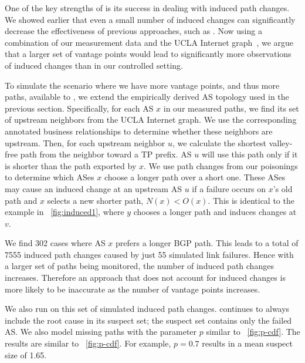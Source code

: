 One of the key strengths of \ouralgo is its success in dealing with
induced path changes. We showed earlier that even a small 
number of induced changes can significantly decrease the effectiveness
of previous approaches, such as \feldmann. Now using a combination
of our measurement data and the UCLA Internet graph~\cite{ucla-topology}, 
we argue that a larger set of vantage points would lead to significantly 
more observations of induced changes than in our controlled setting. 

To simulate the scenario where we have more vantage points, and thus
more paths, available to \ouralgo, we extend the empirically derived AS
topology used in the previous section. Specifically, for each AS $x$ in
our measured paths, we find its set of upstream neighbors from the UCLA
Internet graph. We use the corresponding annotated business
relationships to determine whether these neighbors are upstream. Then,
for each upstream neighbor $u$, we calculate the shortest valley-free
path from the neighbor toward a TP prefix. AS $u$ will use this path
only if it is shorter than the path exported by $x$.  We use path
changes from our poisonings to determine which ASes $x$ choose a longer
path over a short one. These ASes may cause an induced change at an
upstream AS $u$ if a failure occurs on $x$'s old path and $x$ selects a
new shorter path, \ie $N(x) < O(x)$. This is identical to the example in
\fig~\ref{fig:induced1}, where $y$ chooses a longer path and induces
changes at $v$. 

We find 302 cases where AS $x$ prefers a longer BGP path.
This leads to a total of 7555 induced path changes caused by just 55 simulated link failures.
Hence with a larger set of paths being monitored, the number of induced path changes increases. 
Therefore an approach that does not account 
for induced changes is more likely to be inaccurate as the number of vantage points increases.

We also run \ouralgo on this set of simulated induced path changes. 
\ouralgo continues to always include the root cause in its suspect set; 
the suspect set contains only the failed AS.
We also model missing paths with the parameter $p$ similar to \fig~\ref{fig:p-cdf}. The results 
are similar to \fig~\ref{fig:p-cdf}. For example, $p = 0.7$ results in a mean suspect size 
of 1.65.

